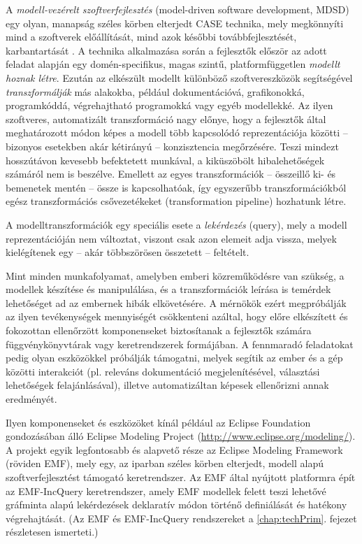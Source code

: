 A \emph{modell-vezérelt szoftverfejlesztés} (model-driven software development, \gls{MDSD}) egy olyan, manapság széles körben elterjedt \gls{CASE} technika, mely megkönnyíti mind a szoftverek előállítását, mind azok későbbi továbbfejlesztését, karbantartását \cite{MDSD:TEM06}.
A technika alkalmazása során a fejlesztők először az adott feladat alapján egy domén-specifikus, magas szintű, platformfüggetlen \emph{modellt hoznak létre}.
Ezután az elkészült modellt különböző szoftvereszközök segítségével \emph{transzformálják} más alakokba, például dokumentációvá, grafikonokká, programkóddá, végrehajtható programokká vagy egyéb modellekké.
Az ilyen szoftveres, automatizált transzformáció nagy előnye, hogy a fejlesztők által meghatározott módon képes a modell több kapcsolódó reprezentációja közötti -- bizonyos esetekben akár kétirányú -- konzisztencia megőrzésére.
Teszi mindezt hosszútávon kevesebb befektetett munkával, a kiküszöbölt hibalehetőségek számáról nem is beszélve.
Emellett az egyes transzformációk -- összeillő ki- és bemenetek mentén -- össze is kapcsolhatóak, így egyszerűbb transzformációkból egész transzformációs csővezetékeket (transformation pipeline) hozhatunk létre.

A modelltranszformációk egy speciális esete a \emph{lekérdezés} (query), mely a modell reprezentációján nem változtat, viszont csak azon elemeit adja vissza, melyek kielégítenek egy -- akár többszörösen összetett -- feltételt.

Mint minden munkafolyamat, amelyben emberi közreműködésre van szükség, a modellek készítése és manipulálása, és a transzformációk leírása is temérdek lehetőséget ad az embernek hibák elkövetésére.
A mérnökök ezért megpróbálják az ilyen tevékenységek mennyiségét csökkenteni azáltal, hogy előre elkészített és fokozottan ellenőrzött komponenseket biztosítanak a fejlesztők számára függvénykönyvtárak vagy keretrendszerek formájában.
A fennmaradó feladatokat pedig olyan eszközökkel próbálják támogatni, melyek segítik az ember és a gép közötti interakciót (pl. releváns dokumentáció megjelenítésével, választási lehetőségek felajánlásával), illetve automatizáltan képesek ellenőrizni annak eredményét.

Ilyen komponenseket és eszközöket kínál például az Eclipse Foundation gondozásában álló Eclipse Modeling Project (\url{http://www.eclipse.org/modeling/}).
A projekt egyik legfontosabb és alapvető része az Eclipse Modeling Framework (röviden \gls{EMF}), mely egy, az iparban széles körben elterjedt, modell alapú szoftverfejlesztést támogató keretrendszer.
Az \gls{EMF} által nyújtott platformra épít az EMF-IncQuery keretrendszer, amely \gls{EMF} modellek felett teszi lehetővé gráfminta alapú lekérdezések deklaratív módon történő definiálását és hatékony végrehajtását.
(Az EMF és EMF-IncQuery rendszereket a \ref{chap:techPrim}. fejezet részletesen ismerteti.)

